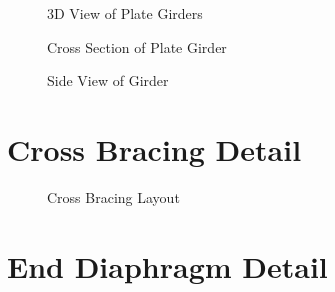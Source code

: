 \documentclass[12pt,a4paper]{report}
\numberwithin{table}{chapter}
\numberwithin{figure}{chapter}
\begin{document}
\begin{figure}[H]
\centering
{}
\caption{3D View of Plate Girders}
\label{fig:girder-3d}
\end{figure}


\begin{figure}[H]
\centering
{}
\caption{Cross Section of Plate Girder}
\label{fig:girder-xsec}
\end{figure}


\begin{figure}[H]
\centering
{}
\caption{Side View of Girder}
\label{fig:girder-side}
\end{figure}


\section{Cross Bracing Detail}
\label{sec:bracing-detail}

\begin{figure}[H]
\centering
{}
\caption{Cross Bracing Layout}
\label{fig:cb-layout}
\end{figure}


\noindent
\begin{minipage}[t]{0.31\textwidth}
\centering
{}
\label{fig:cb-bracing-sec}
\end{minipage}
\hfill
\begin{minipage}[t]{0.31\textwidth}
\centering
{}
\label{fig:cb-top-chord}
\end{minipage}
\hfill
\begin{minipage}[t]{0.31\textwidth}
\centering
{}
\label{fig:cb-bottom-chord}
\end{minipage}
            

\section{End Diaphragm Detail}
\label{sec:diaphragm-detail}
\end{document}
